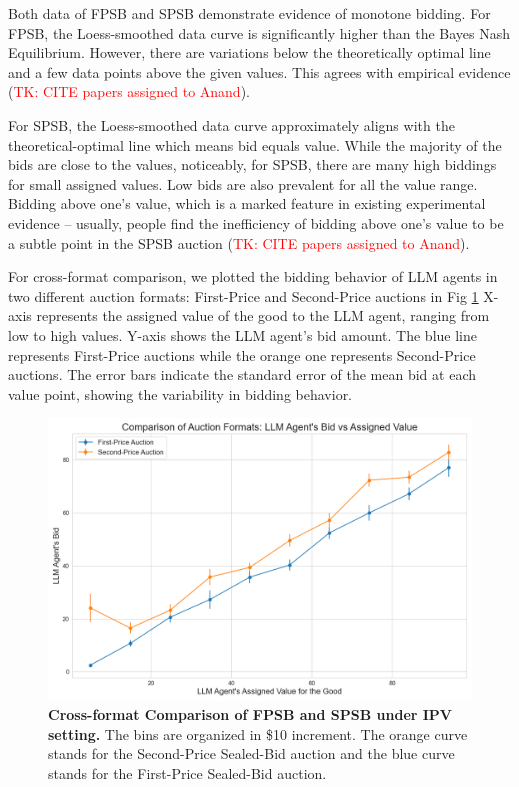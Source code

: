 \documentclass{article} %
\newcommand{\TK}[1]{\textcolor{red}{TK: #1}}
\begin{document}
Both data of FPSB and SPSB demonstrate evidence of monotone bidding.
For FPSB, the Loess-smoothed data curve is significantly higher than the Bayes Nash Equilibrium. However, there are variations below the theoretically optimal line and a few data points above the given values.
This agrees with empirical evidence (\TK{CITE papers assigned to Anand}). 

For SPSB, the Loess-smoothed data curve approximately aligns with the theoretical-optimal line which means bid equals value. While the majority of the bids are close to the values, 
noticeably, for SPSB, there are many high biddings for small assigned values. Low bids are also prevalent for all the value range.
 Bidding above one's value, which is a marked feature in existing experimental evidence -- usually, people find the inefficiency of bidding above one's value to be a subtle point in the SPSB auction (\TK{CITE papers assigned to Anand}).

For cross-format comparison, we plotted the bidding behavior of LLM agents in two different auction formats: First-Price and Second-Price auctions in Fig \ref{fig:cross}
X-axis represents the assigned value of the good to the LLM agent, ranging from low to high values.
Y-axis shows the LLM agent's bid amount.
The blue line represents First-Price auctions while the orange one represents Second-Price auctions.
The error bars indicate the standard error of the mean bid at each value point, showing the variability in bidding behavior.
\begin{figure}[h]
    \centering \includegraphics[width=0.7\linewidth]{Figs/cross-format.png}
    \caption{\textbf{Cross-format Comparison of FPSB and SPSB under IPV setting.} The bins are organized in \$10 increment. The orange curve stands for the Second-Price Sealed-Bid auction and the blue curve stands for the First-Price Sealed-Bid auction.}
    \label{fig:cross}
\end{figure}
\end{document}
